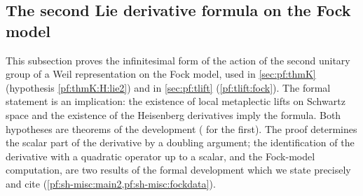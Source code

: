 \subsection{The second Lie derivative formula on the Fock model}\label{sec:pf:sh-misc:lie2}

This subsection proves the infinitesimal form of the action of the second unitary group of a Weil representation on the
Fock model, used in \cref{sec:pf:thmK} (hypothesis \ref{pf:thmK:H:lie2}) and in \cref{sec:pf:tlift} (\cref{pf:tlift:fock}).
The formal statement is an implication: the existence of local metaplectic lifts on Schwartz space and the existence of the
Heisenberg derivatives imply the formula. Both hypotheses are theorems of the development
( for the first). The proof determines the scalar part of the derivative by a
doubling argument; the identification of the derivative with a quadratic operator up to a scalar, and the Fock-model
computation, are two results of the formal development which we state precisely and cite (\cref{pf:sh-misc:main2,pf:sh-misc:fockdata}).


